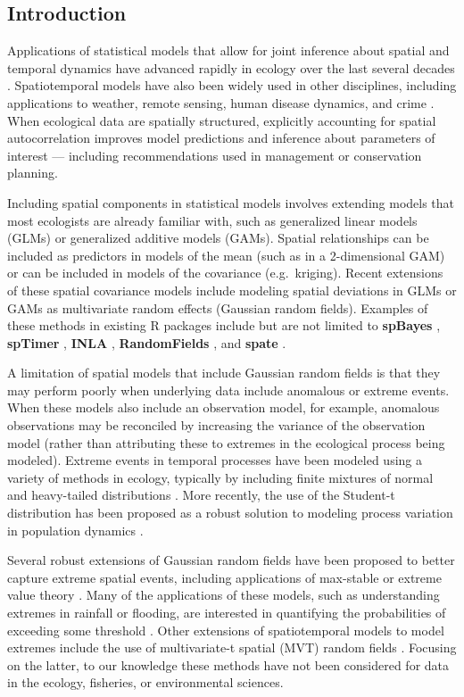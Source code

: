 \documentclass[12pt,english]{article}
\begin{document}
\begin{spacing}{1.25}
\section{Introduction}

Applications of statistical models that allow for joint inference about spatial
and temporal dynamics have advanced rapidly in ecology over the last several
decades \citep{bascompte1995, latimer2009}. Spatiotemporal models have also
been widely used in other disciplines, including applications to weather,
remote sensing, human disease dynamics, and crime \citep{cressie2011}. When
ecological data are spatially structured, explicitly accounting for spatial
autocorrelation improves model predictions and inference about parameters of
interest --- including recommendations used in management or conservation planning.

Including spatial components in statistical models involves extending models
that most ecologists are already familiar with, such as generalized linear
models (GLMs) or generalized additive models (GAMs). Spatial relationships can
be included as predictors in models of the mean (such as in a 2-dimensional
GAM) or can be included in models of the covariance (e.g.\ kriging). Recent
extensions of these spatial covariance models include modeling spatial
deviations in GLMs or GAMs as multivariate random effects (Gaussian random
fields). Examples of these methods in existing R packages include but are
not limited to \textbf{spBayes} \citep{finley2007}, \textbf{spTimer}
\citep{bakar2015}, \textbf{INLA} \citep{rue2009}, \textbf{RandomFields}
\citep{schlather2016}, and \textbf{spate} \citep{sigrist2015}.

A limitation of spatial models that include Gaussian random fields is that
they may perform poorly when underlying data include anomalous or extreme events.
When these models also include an observation model, for example, anomalous
observations may be reconciled by increasing the variance of the observation
model (rather than attributing these to extremes in the ecological process being
modeled). Extreme events in temporal processes have been modeled using a variety
of methods in ecology, typically by including finite mixtures of normal and
heavy-tailed distributions \citep{everitt1996, ward2007, thorson2011}. More
recently, the use of the Student-t distribution has been proposed as a robust
solution to modeling process variation in population dynamics \citep{anderson2017}.

Several robust extensions of Gaussian random fields have been proposed to
better capture extreme spatial events, including applications of max-stable or
extreme value theory \citep{davison2012, davison2012a}. Many of the
applications of these models, such as understanding extremes in rainfall or
flooding, are interested in quantifying the probabilities of exceeding some
threshold \citep{davis2008}. Other extensions of spatiotemporal models to model
extremes include the use of multivariate-t spatial (MVT) random fields
\citep{roislien2007}. Focusing on the latter, to our knowledge these methods
have not been considered for data in the ecology, fisheries, or environmental
sciences.


\end{spacing}
\end{document}
